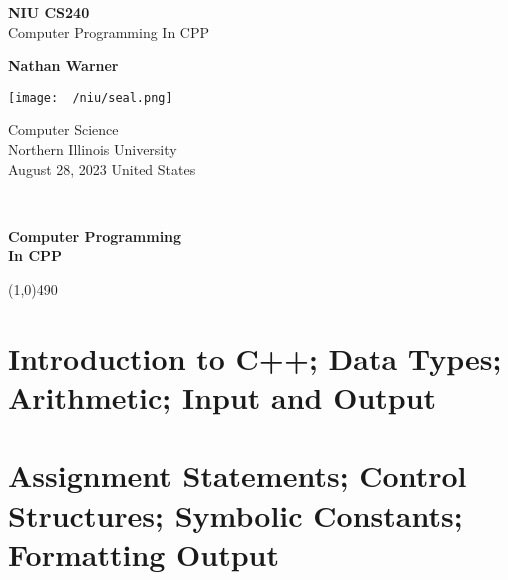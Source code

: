 \documentclass{report}
\title{\Huge{}}
\author{\huge{Nathan Warner}}
\date{\huge{}}
\begin{document}
        \begin{titlepage}
       \begin{center}
           \vspace*{1cm}
    
           \textbf{NIU CS240} \\
           Computer Programming In CPP
    
           \vspace{0.5cm}
            
                
           \vspace{1.5cm}
             
           \textbf{Nathan Warner}
    
           \vfill
                
                
           \vspace{0.8cm}
         
           \texttt{[image: ~/niu/seal.png]}
                
           Computer Science \\
           Northern Illinois University\\
           August 28, 2023
           United States\\
           
                
       \end{center}
    \end{titlepage}
    \tableofcontent 
    \pagebreak \bigbreak \noindent 
    \vspace{2in} \\
    \begin{Huge}
       \textbf{Computer Programming \\
       In CPP} 
    \end{Huge}
    \bigbreak \noindent 
    \line(1,0){490}
    
    \bigbreak \noindent \bigbreak \noindent 
    \section{Introduction to C++; Data Types; Arithmetic; Input and Output}
    \pagebreak \bigbreak \noidennt

    \section{Assignment Statements; Control Structures; Symbolic Constants; Formatting Output}
    \pagebreak \bigbreak \noidennt
\end{document}
